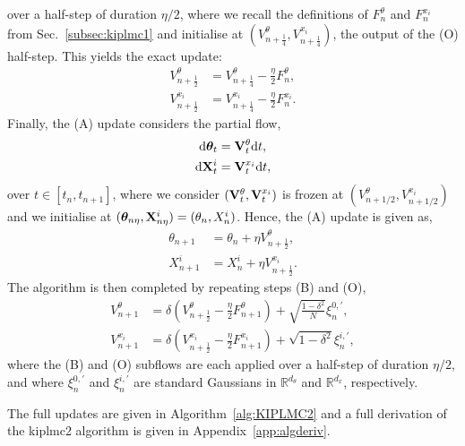 over a half-step of duration $\eta/2$, where we recall the definitions of $F_n^\theta$ and $F_n^{x_i}$ from Sec.~\ref{subsec:kiplmc1} and initialise at $(V_{n+\frac{1}{4}}^\theta,V_{n+\frac{1}{4}}^{x_i})$, the output of the (O) half-step. This yields the exact update:
\begin{equation}
\begin{aligned}
V_{n+\frac{1}{2}}^\theta &= V_{n+\frac{1}4}^\theta - \frac{\eta}{2} F_n^\theta,\\
V_{n+\frac{1}2}^{x_i} &= V_{n+\frac{1}4}^{x_i} - \frac{\eta}{2} F_n^{x_i}.
\end{aligned}\tag{B}
\end{equation}
Finally, the (A) update considers the partial flow,
\begin{align*}
\mathrm{d} \bm{\theta}_t &= {\mathbf V}_t^\theta \mathrm{d}t,\\
\mathrm{d} {\mathbf X}_t^i &= {\mathbf V}_t^{x_i}\mathrm{d}t,
\end{align*}
over $t\in [t_n, t_{n+1}]$, where we consider $({\mathbf V}_t^\theta,{\mathbf V}_t^{x_i})$ is frozen at $(V_{n+1/2}^\theta, V_{n+1/2}^{x_i})$ and we initialise at $(\bm{\theta}_{n\eta}, {\mathbf X}_{n\eta}^i)=(\theta_n, X_n^i)$. Hence, the (A) update is given as,
\begin{equation}
\begin{aligned}
\theta_{n+1} &= \theta_n + \eta V_{n+\frac{1}{2}}^\theta,\\
X_{n+1}^i &= X_n^i + \eta V_{n+\frac{1}{2}}^{x_i}.
\end{aligned}\tag{A}
\end{equation}
The algorithm is then completed by repeating steps (B) and (O),
\begin{equation}
\begin{aligned}
V_{n+1}^\theta &= \delta \left(V_{n+\frac{1}{2}}^\theta -\frac{\eta}{2} F_{n+1}^\theta\right)+ \sqrt{\frac{1-\delta^2}{N}} \xi_n^{0,\prime},\\
V_{n+1}^{x_i} &= \delta\left(V_{n+\frac{1}{2}}^{x_i} - \frac{\eta}{2} F_{n+1}^{x_i}\right)+ \sqrt{1-\delta^2} \xi_n^{i,\prime},
\end{aligned}\tag{B+O}
\end{equation}
where the (B) and (O) subflows are each applied over a half-step of duration $\eta/2$, and where $\xi_n^{0,\prime}$ and $\xi_n^{i,\prime}$ are standard Gaussians in $\mathbb{R}^{d_\theta}$ and $\mathbb{R}^{d_x}$, respectively.

The full updates are given in Algorithm~\ref{alg:KIPLMC2} and a full derivation of the \gls*{kiplmc2} algorithm is given in Appendix~\ref{app:algderiv}. 
